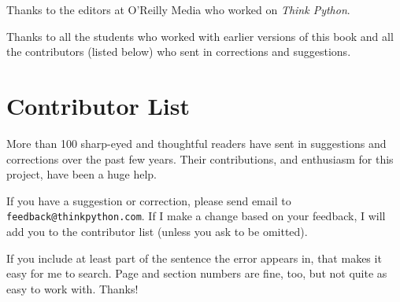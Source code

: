 \documentclass[10pt]{book}
\begin{document}
Thanks to the editors at O'Reilly Media who worked on
{\em Think Python}.

Thanks to all the students who worked with earlier
versions of this book and all the contributors (listed
below) who sent in corrections and suggestions.


\section*{Contributor List}

More than 100 sharp-eyed and thoughtful readers have sent in
suggestions and corrections over the past few years.  Their
contributions, and enthusiasm for this project, have been a
huge help.

If you have a suggestion or correction, please send email to 
{\tt feedback@thinkpython.com}.  If I make a change based on your
feedback, I will add you to the contributor list
(unless you ask to be omitted).

If you include at least part of the sentence the
error appears in, that makes it easy for me to search.  Page and
section numbers are fine, too, but not quite as easy to work with.
Thanks!
\end{document}
